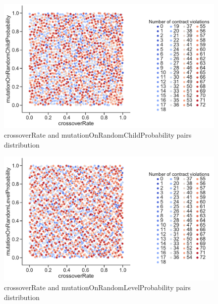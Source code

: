 \begin{figure}
	\centering
	\includegraphics[width=\textwidth]{images/PairsDistr/crossoverRate_mutationOnRandomChildProbability.pdf}
	\caption[crossoverRate and mutationOnRandomChildProbability pairs distribution]{crossoverRate and mutationOnRandomChildProbability pairs distribution}
	\label{fig:crossoverRate_mutationOnRandomChildProbability_pair}
\end{figure}
\clearpage
\begin{figure}
	\centering
	\includegraphics[width=\textwidth]{images/PairsDistr/crossoverRate_mutationOnRandomLevelProbability.pdf}
	\caption[crossoverRate and mutationOnRandomLevelProbability pairs distribution]{crossoverRate and mutationOnRandomLevelProbability pairs distribution}
	\label{fig:crossoverRate_mutationOnRandomLevelProbability_pair}
\end{figure}
\clearpage

